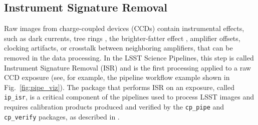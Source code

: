 \subsection{Instrument Signature Removal}
\label{sec:isr}

Raw images from charge-coupled devices (CCDs) contain instrumental effects, such as dark currents, tree rings \citep{2020JATIS...6a1005P}, the brighter-fatter effect \citep{2024PASP..136d5003B}, amplifier offsets, clocking artifacts, or crosstalk between neighboring amplifiers, that can be removed in the data processing.
In the LSST Science Pipelines, this step is called Instrument Signature Removal (ISR) and is the first processing applied to a raw CCD exposure (see, for example, the pipeline workflow example shown in Fig.~\ref{fig:pipe_viz}).
The package that performs ISR on an exposure, called \texttt{ip\_isr}, is a critical component of the pipelines used to process LSST images and requires calibration products produced and verified by the \texttt{cp\_pipe} and \texttt{cp\_verify} packages, as described in .
